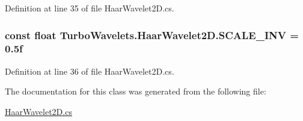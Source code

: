 Definition at line 35 of file Haar\+Wavelet2\+D.\+cs.

\hypertarget{class_turbo_wavelets_1_1_haar_wavelet2_d_adbc2c681478c8bd315a77b6ddf57e9bd}{
\subsubsection[{S\+C\+A\+L\+E\+\_\+\+I\+N\+V}]{\setlength{\rightskip}{0pt plus 5cm}const float Turbo\+Wavelets.\+Haar\+Wavelet2\+D.\+S\+C\+A\+L\+E\+\_\+\+I\+N\+V = 0.\+5f\hspace{0.3cm}{\ttfamily [protected]}}}\label{class_turbo_wavelets_1_1_haar_wavelet2_d_adbc2c681478c8bd315a77b6ddf57e9bd}


Definition at line 36 of file Haar\+Wavelet2\+D.\+cs.



The documentation for this class was generated from the following file\+:\begin{DoxyCompactItemize}
\item 
\hyperlink{_haar_wavelet2_d_8cs}{Haar\+Wavelet2\+D.\+cs}\end{DoxyCompactItemize}
